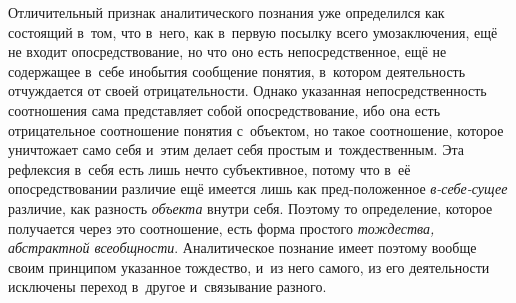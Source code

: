Отличительный признак аналитического познания уже определился
как состоящий в~том, что в~него, как в~первую посылку всего умозаключения,
ещё не входит опосредствование, но что оно есть непосредственное, ещё не
содержащее в~себе инобытия сообщение понятия, в~котором деятельность
отчуждается от своей отрицательности. Однако указанная непосредственность
соотношения сама представляет собой опосредствование, ибо она есть
отрицательное соотношение понятия с~объектом, но такое соотношение, которое
уничтожает само себя и~этим делает себя простым и~тождественным. Эта
рефлексия в~себя есть лишь нечто субъективное, потому что в~её
опосредствовании различие ещё имеется лишь как пред-положенное
{\em в-себе-сущее}
различие, как разность
{\em объекта} внутри
себя. Поэтому то определение, которое получается через это соотношение,
есть форма простого {\em тождества,
абстрактной всеобщности}. Аналитическое познание имеет
поэтому вообще своим принципом указанное тождество, и~из него самого, из
его деятельности исключены переход в~другое и~связывание разного.

